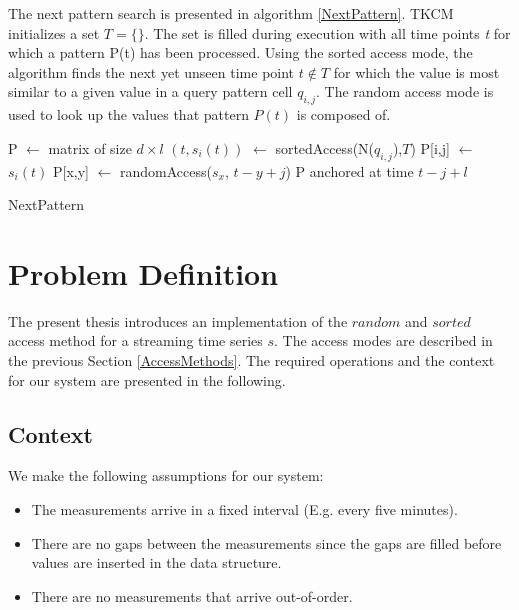 \documentclass[abstracton,12pt,oneside]{scrreprt}
\begin{document}
The next pattern search is presented in algorithm \ref{NextPattern}. TKCM initializes a set $T =\{\}$. The set is filled during execution with all time points \emph{t} for which a pattern P(t) has been processed. 
Using the sorted access mode, the algorithm finds the next yet unseen time point $t \notin T$ for which the value is most similar to a given value in a query pattern cell $q_{i,j}$. The random access mode is used to look up the values that pattern $P(t)$ is composed of. 

\BlankLine
\begin{algorithm}[H]
	\IncMargin{1em}
	\SetAlgoLined
	\DontPrintSemicolon

		P $\leftarrow$ matrix of size $d\times l$\;
		$(t, s_i(t))$ $\leftarrow$ sortedAccess(N($q_{i,j}$),$T$)\; 
		P[i,j] $\leftarrow$ $s_i(t)$\;	
		{
		P[x,y] $\leftarrow$ randomAccess($s_x$, $t-y+j$)\;
		}
		\Return P anchored at time $t-j+l$\;
	
	
	\caption{NextPattern}
	\label{NextPattern}
\end{algorithm}


\chapter{Problem Definition}
\label{ProblemDefinition}
The present thesis introduces an implementation of the $random$ and $sorted$ access method for a streaming time series $s$. The access modes are described in the previous Section \ref{AccessMethods}. The required operations and the context for our system are presented in the following.

\section{Context}
We make the following assumptions for our system: 
\begin{itemize}  
	\item The measurements arrive in a fixed interval (E.g. every five minutes). 
	\item There are no gaps between the measurements since the gaps are filled before values are inserted in the data structure.
	\item There are no measurements that arrive out-of-order.
\end{itemize}
\end{document}

